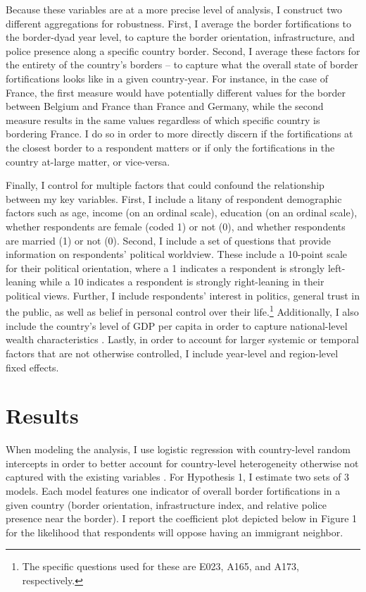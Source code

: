 \documentclass[12pt,]{article}
\begin{document}
Because these variables are at a more precise level of analysis, I
construct two different aggregations for robustness. First, I average
the border fortifications to the border-dyad year level, to capture the
border orientation, infrastructure, and police presence along a specific
country border. Second, I average these factors for the entirety of the
country's borders -- to capture what the overall state of border
fortifications looks like in a given country-year. For instance, in the
case of France, the first measure would have potentially different
values for the border between Belgium and France than France and
Germany, while the second measure results in the same values regardless
of which specific country is bordering France. I do so in order to more
directly discern if the fortifications at the closest border to a
respondent matters or if only the fortifications in the country at-large
matter, or vice-versa.

Finally, I control for multiple factors that could confound the
relationship between my key variables. First, I include a litany of
respondent demographic factors such as age, income (on an ordinal
scale), education (on an ordinal scale), whether respondents are female
(coded 1) or not (0), and whether respondents are married (1) or not
(0). Second, I include a set of questions that provide information on
respondents' political worldview. These include a 10-point scale for
their political orientation, where a 1 indicates a respondent is
strongly left-leaning while a 10 indicates a respondent is strongly
right-leaning in their political views. Further, I include respondents'
interest in politics, general trust in the public, as well as belief in
personal control over their life.\footnote{The specific questions used
  for these are E023, A165, and A173, respectively.} Additionally, I
also include the country's level of GDP per capita in order to capture
national-level wealth characteristics \citep{worldbank}. Lastly, in
order to account for larger systemic or temporal factors that are not
otherwise controlled, I include year-level and region-level fixed
effects.

\section{Results}\label{results}

When modeling the analysis, I use logistic regression with country-level
random intercepts in order to better account for country-level
heterogeneity otherwise not captured with the existing variables
\citep{bell2015}. For Hypothesis 1, I estimate two sets of 3 models.
Each model features one indicator of overall border fortifications in a
given country (border orientation, infrastructure index, and relative
police presence near the border). I report the coefficient plot depicted
below in Figure 1 for the likelihood that respondents will oppose having
an immigrant neighbor.
\end{document}
